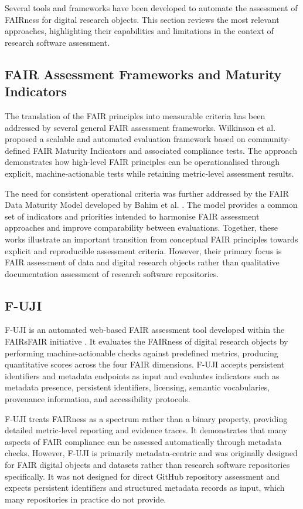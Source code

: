 Several tools and frameworks have been developed to automate the 
assessment of FAIRness for digital research objects. This section 
reviews the most relevant approaches, highlighting their capabilities 
and limitations in the context of research software assessment.

\subsection{FAIR Assessment Frameworks and Maturity Indicators}

The translation of the FAIR principles into measurable criteria has
been addressed by several general FAIR assessment frameworks.
Wilkinson et al. \cite{wilkinson2019evaluating} proposed a scalable
and automated evaluation framework based on community-defined FAIR
Maturity Indicators and associated compliance tests. The approach
demonstrates how high-level FAIR principles can be operationalised
through explicit, machine-actionable tests while retaining
metric-level assessment results.

The need for consistent operational criteria was further addressed by
the FAIR Data Maturity Model developed by Bahim et al.
\cite{bahim2020fairdmm}. The model provides a common set of indicators
and priorities intended to harmonise FAIR assessment approaches and
improve comparability between evaluations. Together, these works
illustrate an important transition from conceptual FAIR principles
towards explicit and reproducible assessment criteria. However, their
primary focus is FAIR assessment of data and digital research objects
rather than qualitative documentation assessment of research software
repositories.

\subsection{F-UJI}

F-UJI is an automated web-based FAIR assessment tool developed within 
the FAIRsFAIR initiative \cite{fuji2021}. It evaluates the FAIRness 
of digital research objects by performing machine-actionable checks 
against predefined metrics, producing quantitative scores across the 
four FAIR dimensions. F-UJI accepts persistent identifiers and 
metadata endpoints as input and evaluates indicators such as metadata 
presence, persistent identifiers, licensing, semantic vocabularies, 
provenance information, and accessibility protocols.

F-UJI treats FAIRness as a spectrum rather than a binary property, 
providing detailed metric-level reporting and evidence traces. It 
demonstrates that many aspects of FAIR compliance can be assessed 
automatically through metadata checks. However, F-UJI is primarily 
metadata-centric and was originally designed for FAIR digital objects 
and datasets rather than research software repositories specifically. 
It was not designed for direct GitHub repository assessment and 
expects persistent identifiers and structured metadata records as 
input, which many repositories in practice do not provide.


